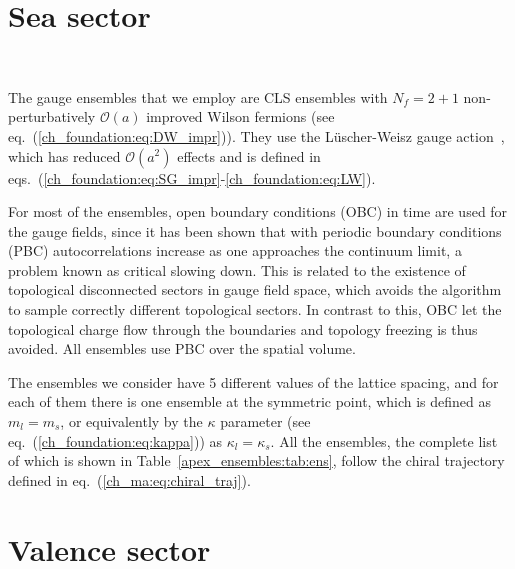 
\section{Sea sector}
\label{ch_ma:sec:Sea}

~\cite{CLS}

The gauge ensembles that we employ are CLS ensembles with $N_f=2+1$ non-perturbatively $\mathcal{O}(a)$ improved Wilson fermions (see eq.~(\ref{ch_foundation:eq:DW_impr})). They use the Lüscher-Weisz gauge action~\cite{}, which has reduced $\mathcal{O}(a^2)$ effects and is defined in eqs.~(\ref{ch_foundation:eq:SG_impr}-\ref{ch_foundation:eq:LW}).

For most of the ensembles, open boundary conditions (OBC) in time are used for the gauge fields, since it has been shown that with periodic boundary conditions (PBC) autocorrelations increase as one approaches the continuum limit, a problem known as critical slowing down. This is related to the existence of topological disconnected sectors in gauge field space, which avoids the algorithm to sample correctly different topological sectors. In contrast to this, OBC let the topological charge flow through the boundaries and topology freezing is thus avoided. All ensembles use PBC over the spatial volume.

The ensembles we consider have 5 different values of the lattice spacing, and for each of them there is one ensemble at the symmetric point, which is defined as $m_l=m_s$, or equivalently by the $\kappa$ parameter (see eq.~(\ref{ch_foundation:eq:kappa})) as $\kappa_l=\kappa_s$. All the ensembles, the complete list of which is shown in Table~\ref{apex_ensembles:tab:ens}, follow the chiral trajectory defined in eq.~(\ref{ch_ma:eq:chiral_traj}).




\section{Valence sector}
\label{ch_ma:sec:Valence}

